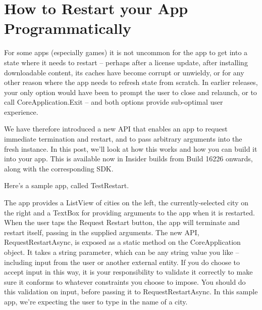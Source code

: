 \section{How to Restart your App Programmatically}

For some apps (especially games) it is not uncommon for the app to get into a state where it needs to restart – perhaps after a license update, after installing downloadable content, its caches have become corrupt or unwieldy, or for any other reason where the app needs to refresh state from scratch. In earlier releases, your only option would have been to prompt the user to close and relaunch, or to call CoreApplication.Exit – and both options provide sub-optimal user experience. 

We have therefore introduced a new API that enables an app to request immediate termination and restart, and to pass arbitrary arguments into the fresh instance. In this post, we’ll look at how this works and how you can build it into your app. This is available now in Insider builds from Build 16226 onwards, along with the corresponding SDK.

Here’s a sample app, called TestRestart. 

The app provides a ListView of cities on the left, the currently-selected city on the right and a TextBox for providing arguments to the app when it is restarted. When the user taps the Request Restart button, the app will terminate and restart itself, passing in the supplied arguments. The new API, RequestRestartAsync, is exposed as a static method on the CoreApplication object. It takes a string parameter, which can be any string value you like – including input from the user or another external entity. If you do choose to accept input in this way, it is your responsibility to validate it correctly to make sure it conforms to whatever constraints you choose to impose. You should do this validation on input, before passing it to RequestRestartAsync. In this sample app, we’re expecting the user to type in the name of a city.



